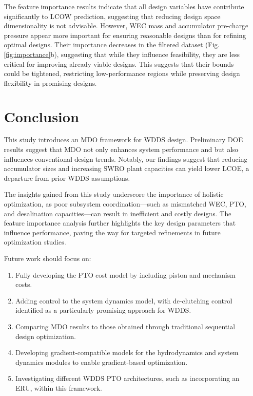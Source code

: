 \documentclass[twocolumn,10pt]{asme2e}
\begin{document}
The feature importance results indicate that all design variables have contribute significantly to LCOW prediction, suggesting that reducing design space dimensionality is not advisable. However, WEC mass and accumulator pre-charge pressure appear more important for ensuring reasonable designs than for refining optimal designs. Their importance decreases in the filtered dataset (Fig. \ref{fig:importance}b), suggesting that while they influence feasibility, they are less critical for improving already viable designs. This suggests that their bounds could be tightened, restricting low-performance regions while preserving design flexibility in promising designs. 

\section{Conclusion}
This study introduces an MDO framework for WDDS design. Preliminary DOE results suggest that MDO not only enhances system performance and but also influences  conventional design trends. Notably, our findings suggest that reducing accumulator sizes and increasing SWRO plant capacities can yield lower LCOE, a departure from prior WDDS assumptions.

The insights gained from this study underscore the importance of holistic optimization, as poor subsystem coordination---such as mismatched WEC, PTO, and desalination capacities---can result in inefficient and costly designs. The feature importance analysis further highlights the key design parameters that influence performance, paving the way for targeted refinements in future optimization studies.

Future work should focus on:
\begin{enumerate}
    \item Fully developing the PTO cost model by including piston and mechanism costs.
    \item Adding control to the system dynamics model, with de-clutching control \cite{Ringwood2014} identified as a particularly promising approach for WDDS.
    \item Comparing MDO results to those obtained through traditional sequential design optimization.
    \item Developing gradient-compatible models for the hydrodynamics and system dynamics modules to enable gradient-based optimization.
    \item Investigating different WDDS PTO architectures, such as incorporating an ERU, within this framework.
\end{enumerate}
\end{document}
